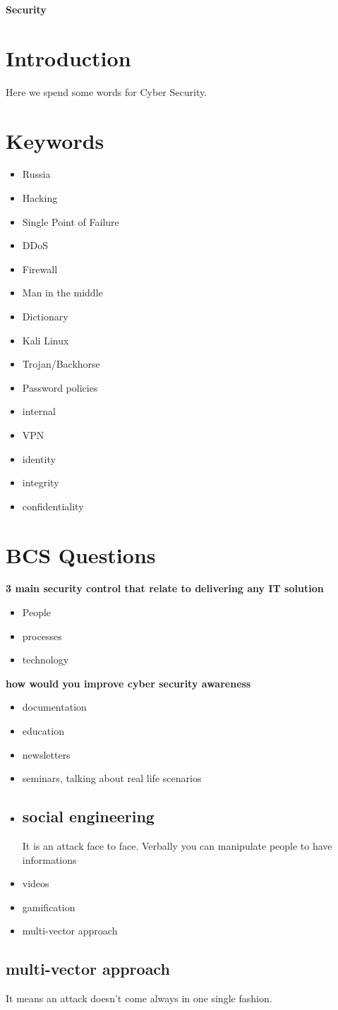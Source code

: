\documentclass[a4paper,12pt]{article}
\begin{document}
\textbf{Security}


\tableofcontents
\clearpage

 
\section{Introduction}
Here we spend some words for Cyber Security.
\section{Keywords}

\begin{itemize}
\item Russia
\item Hacking
\item Single Point of Failure
\item DDoS
\item Firewall
\item Man in the middle
\item Dictionary
\item Kali Linux
\item Trojan/Backhorse
\item Password policies
\item internal
\item VPN
\item identity 
\item integrity
\item confidentiality
\end{itemize}

\section{BCS Questions}

\textbf {3 main security control that relate to delivering any IT solution}
\begin{itemize}
\item People
\item processes
\item technology 
\end{itemize}


\textbf {how would you improve cyber security awareness}
\begin{itemize}
\item documentation
\item education
\item newsletters
\item seminars, talking about real life scenarios
\item \subsection{social engineering}
It is an attack face to face. Verbally you can manipulate people to have informations
\item videos
\item gamification
\item multi-vector approach
\end{itemize}

\subsection{multi-vector approach}
It means an attack doesn't come always in one single fashion. 


\clearpage

\printindex
\end{document}
